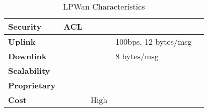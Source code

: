 \begin{table}[h!]
\begin{tabulary}{\textwidth}{L|L|L|L|L}
	\bf{Security}                          & ACL                       &                                 &                                       & \\\hline
	\bf{Uplink}                            &                           &                                 & 100bps, 12 bytes/msg                  & \\\hline
	\bf{Downlink}                          &                           &                                 & 8 bytes/msg                           & \\\hline
	\bf{Scalability}                       &                           &                                 &                                       & \\\hline
	\bf{Proprietary}                       &                           &                                 & \ok                                   & \\\hline
	\bf{Cost}                              &                           & High                            &                                       & \\\hline
	\end{tabulary}
	\caption{\label{tab:LPWan_characteristics} LPWan Characteristics \cite{al-kashoash_comparison_2016}}
\end{table}

